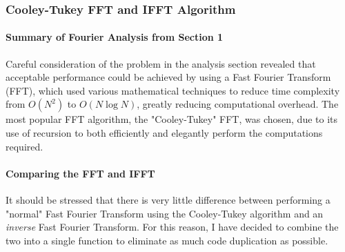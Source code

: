 \subsubsection{Cooley-Tukey FFT and IFFT Algorithm}

\paragraph{Summary of Fourier Analysis from Section 1}  Careful consideration of the problem in the analysis section revealed that acceptable performance could be achieved by using a Fast Fourier Transform (FFT), which used various mathematical techniques to reduce time complexity from \(O(N^2)\) to \(O(N\log{N})\), greatly reducing computational overhead. The most popular FFT algorithm, the "Cooley-Tukey"  FFT, was chosen, due to its use of recursion to both efficiently  and elegantly perform the computations required.

\paragraph{Comparing the FFT and IFFT}
It should be stressed that there is very little difference between performing a "normal" Fast Fourier Transform using the Cooley-Tukey algorithm and an \textit{inverse} Fast Fourier Transform. For this reason, I have decided to combine the two into a single function to eliminate as much code duplication as possible.

\pagebreak
